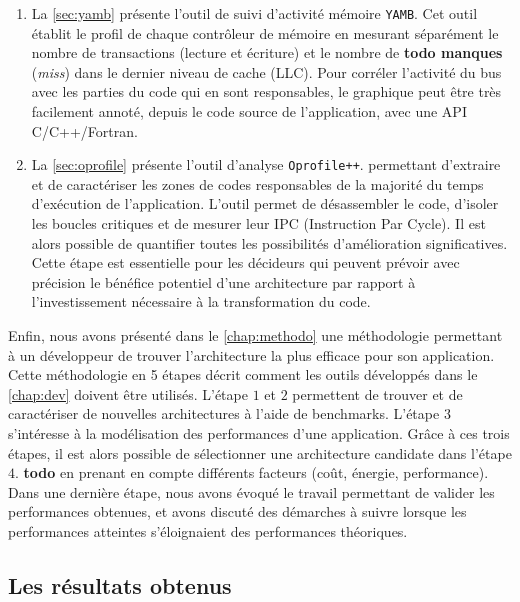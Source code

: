 \begin{enumerate}
            \item La \autoref{sec:yamb} présente l'outil de suivi d'activité mémoire \verb|YAMB|. Cet outil établit le profil de chaque contrôleur de mémoire en mesurant séparément le nombre de transactions (lecture et écriture) et le nombre de \textbf{todo manques} (\textit{miss}) dans le dernier niveau de cache (LLC). Pour corréler l'activité du bus avec les parties du code qui en sont responsables, le graphique peut être très facilement annoté, depuis le code source de l'application, avec une API C/C++/Fortran.
            
            \item La \autoref{sec:oprofile} présente  l'outil d'analyse \verb|Oprofile++|.
            permettant d'extraire et de caractériser les zones de codes responsables de la majorité du temps d'exécution de l'application. L'outil permet de désassembler le code, d'isoler les boucles critiques et de mesurer leur IPC (Instruction Par Cycle). Il est alors possible de quantifier toutes les possibilités d'amélioration significatives. Cette étape est essentielle pour les décideurs qui peuvent prévoir avec précision le bénéfice potentiel d'une architecture par rapport à l'investissement nécessaire à la transformation du code.
        
        \end{enumerate}
        
        Enfin, nous avons présenté dans le \autoref{chap:methodo} une méthodologie permettant à un développeur de trouver l'architecture la plus efficace pour son application. Cette méthodologie en 5 étapes décrit comment les outils développés dans le \autoref{chap:dev} doivent être utilisés. L'étape $1$ et $2$ permettent de trouver et de caractériser de nouvelles architectures à l'aide de benchmarks. L'étape $3$ s'intéresse à la modélisation des performances d'une application. Grâce à ces trois étapes, il est alors possible de sélectionner une architecture candidate dans l'étape $4$. \textbf{todo} en prenant en compte différents facteurs (coût, énergie, performance). Dans une dernière étape, nous avons évoqué le travail permettant de valider les performances obtenues, et avons discuté des démarches à suivre lorsque les performances atteintes s'éloignaient des performances théoriques.
               
 
 
    \subsection{Les résultats obtenus}
   
